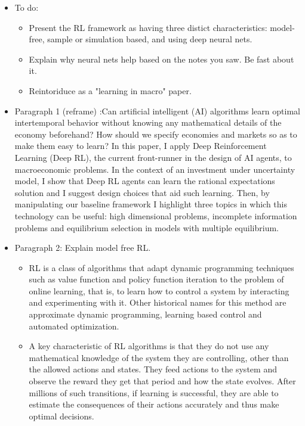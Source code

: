 \documentclass[11pt,english]{article}
\begin{document}
\begin{itemize}
		\item {\color{red} To do: 
		
		\begin{itemize}
			\item Present the RL framework as having three distict characteristics: model-free, sample or simulation based, and using deep neural nets.
			\item Explain why neural nets help based on the notes you saw. Be fast about it.
			\item Reintoriduce as a "learning in macro" paper.
	\end{itemize}}

	\item Paragraph 1 (reframe) :Can artificial intelligent (AI) algorithms learn optimal intertemporal behavior without knowing any mathematical details of the economy beforehand?  How should we specify economies and markets so as to make them easy to learn? In this paper, I apply Deep Reinforcement Learning (Deep RL), the current front-runner in the design of AI agents, to macroeconomic problems. In the context of an investment under uncertainty model, I show that Deep RL agents can learn the rational expectations solution and I suggest design choices that aid such learning. Then, by manipulating our baseline framework I highlight three topics in which this technology can be useful: high dimensional problems, incomplete information problems and equilibrium selection in models with multiple equilibrium.\medskip
	
	\item Paragraph 2: Explain model free RL. \medskip 
	
	\begin{itemize}
		\item RL is a class of algorithms that adapt dynamic programming techniques such as value function and policy function iteration to the problem of online learning, that is, to learn how to control a system by interacting and experimenting with it. Other historical names for this method are approximate dynamic programming, learning based control and automated optimization.  \medskip
		\item A key characteristic of RL algorithms is that they do not use any mathematical knowledge of  the system they are controlling, other than the allowed actions and states. They feed actions to the system and observe the reward they get that period and how the state evolves. After millions of such transitions, if learning is successful, they are able to estimate the consequences of their actions accurately and thus make optimal decisions. \medskip
	\end{itemize}


\end{itemize}
\end{document}
